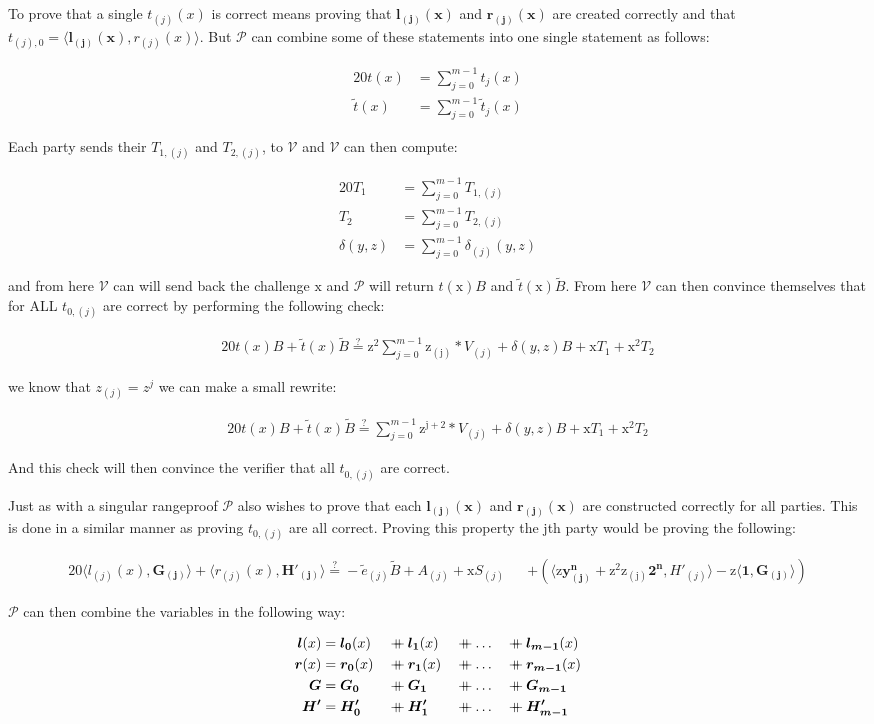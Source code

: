 \documentclass{article}
\newcommand{\eq}[1]{\begin{alignat*}{20}#1\end{alignat*}}
\renewcommand{\vec}[1]{\boldsymbol{#1}}
\newcommand{\ran}[1]{\mathrm{#1}}
\newcommand{\vecran}[1]{\mathbf{#1}}
\newcommand{\V}{\mathcal{V}}
\renewcommand{\P}{\mathcal{P}}
\newcommand{\tB}{\widetilde{B}}
\renewcommand{\tt}{\widetilde{t}}
\newcommand\concat{\mathbin{+\mkern-10mu+}} %
\newcommand{\dotp}[2]{\langle #1, #2 \rangle}
\begin{document}
To prove that a single $t_{(j)}(x)$ is correct means proving that $\vec{l_{(j)}(x)}$ and $\vec{r_{(j)}(x)}$ are created correctly and that $t_{(j), 0} = \dotp{\vec{l_{(j)}(x)}}{r_{(j)}(x)}$. But $\P$ can combine some of these statements into one single statement as follows: 

\eq{
	t(x) &= \sum^{m-1}_{j = 0} t_{j}(x)\\
	\widetilde{t}(x) &= \sum^{m-1}_{j = 0} \widetilde{t}_{j}(x)
}

Each party sends their $T_{1,(j)}$ and $T_{2,(j)}$, to $\V$ and $\V$ can then compute:

\eq{
	T_1 &= \sum^{m-1}_{j = 0} T_{1,(j)}\\
	T_2 &= \sum^{m-1}_{j = 0} T_{2,(j)}\\
	\delta(y,z) &= \sum^{m-1}_{j = 0} \delta_{(j)}(y,z)
}

and from here $\V$ can will send back the challenge $\ran{x}$ and $\P$ will return $t(\ran{x})B$ and $\tt(\ran{x})\tB$. From here $\V$ can then convince themselves that for ALL $t_{0,(j)}$ are correct by performing the following check: 

\eq{
	t(x)B + \widetilde{t}(x)\widetilde{B} \stackrel{?}{=} \ran{z^2}\sum^{m-1}_{j = 0} \ran{z_{(j)}}*V_{(j)} + \delta(y,z)B + \ran{x}T_1 + \ran{x^2}T_2
}

we know that $z_{(j)} = z^j$ we can make a small rewrite:

\eq{
	t(x)B + \widetilde{t}(x)\widetilde{B} \stackrel{?}{=} \sum^{m-1}_{j = 0} \ran{z^{j+2}}*V_{(j)} + \delta(y,z)B + \ran{x}T_1 + \ran{x^2}T_2
}

And this check will then convince the verifier that all $t_{0,(j)}$ are correct.

Just as with a singular rangeproof $\P$ also wishes to prove that each $\vec{l_{(j)}(x)}$ and $\vec{r_{(j)}(x)}$ are constructed correctly for all parties. This is done in a similar manner as proving $t_{0,(j)}$ are all correct. Proving this property the jth party would be proving the following:

\eq{
	\dotp{l_{(j)}(x)}{\vec{G_{(j)}}} + \dotp{r_{(j)}(x)}{\vec{H'_{(j)}}} \stackrel{?}{=} -\widetilde{e}_{(j)}\widetilde{B} + A_{(j)} + \ran{x}S_{(j)} &&+ (\dotp{\ran{z}\vecran{y^n_{(j)}} + \ran{z^2}\ran{z_{(j)}}\vec{2^n}}{H'_{(j)}} - \ran{z}\dotp{\vec{1}}{\vec{G_{(j)}}})
}

$\P$ can then combine the variables in the following way:

\eq{
	\vec{l}(x) &= \vec{l_0}(x) &&\concat \vec{l_1}(x) &&\concat \dots &&\concat \vec{l_{m-1}}(x)\\
	\vec{r}(x) &= \vec{r_0}(x) &&\concat \vec{r_1}(x) &&\concat \dots &&\concat \vec{r_{m-1}}(x)\\
	\vec{G} &= \vec{G_0} &&\concat \vec{G_1} &&\concat \dots &&\concat \vec{G_{m-1}}\\
	\vec{H'} &= \vec{H'_0} &&\concat \vec{H'_1} &&\concat \dots &&\concat \vec{H'_{m-1}}
}
\end{document}

